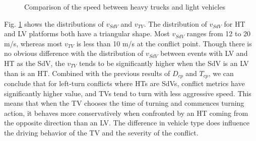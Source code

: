 \documentclass[letterpaper, 10 pt, conference]{ieeeconf}
\begin{document}
\begin{figure}
      \caption{Comparison of the speed between heavy trucks and light vehicles}%
      \label{fig:GroupBySpeedTcp}
 \end{figure}
Fig. \ref{fig:GroupBySpeedTcp} shows the distributions of $v_{SdV}$ and $v_{TV}$. The distribution of $v_{SdV}$ for HT and LV platforms both have a triangular shape. Most $v_{SdV}$ ranges from 12 to 20 m/s, whereas most $v_{TV}$ is less than 10 m/s at the conflict point. Though there is no obvious difference with the distribution of $v_{SdV}$ between events with LV and HT as the SdV, the $v_{TV}$ tends to be significantly higher when the SdV is an LV than is an HT. Combined with the previous results of $D_{cp}$ and $T_{cp}$, we can conclude that for left-turn conflicts where HTs are SdVs, conflict metrics have significantly higher value, and TVs tend to turn with less aggressive speed. This means that when the TV chooses the time of turning and commences turning action, it behaves more conservatively when confronted by an HT coming from the opposite direction than an LV. The difference in vehicle type does influence the driving behavior of the TV and the severity of the conflict.

\end{document}
